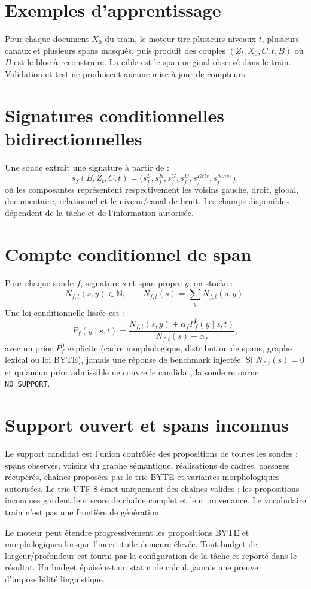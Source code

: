 \documentclass[11pt,a4paper,oneside]{report}
\newcommand{\N}{\mathbb{N}}
\begin{document}
\section{Exemples d'apprentissage}
Pour chaque document $X_0$ du train, le moteur tire plusieurs niveaux $t$, plusieurs canaux et plusieurs spans masqués, puis produit des couples $(Z_t,X_0,C,t,B)$ où $B$ est le bloc à reconstruire. La cible est le span original observé dans le train. Validation et test ne produisent aucune mise à jour de compteurs.

\section{Signatures conditionnelles bidirectionnelles}
Une sonde extrait une signature à partir de :
\[
s_f(B,Z_t,C,t)=\bigl(s_f^{L},s_f^{R},s_f^{G},s_f^{D},s_f^{Rels},s_f^{Noise}\bigr),
\]
où les composantes représentent respectivement les voisins gauche, droit, global, documentaire, relationnel et le niveau/canal de bruit. Les champs disponibles dépendent de la tâche et de l'information autorisée.

\section{Compte conditionnel de span}
Pour chaque sonde $f$, signature $s$ et span propre $y$, on stocke :
\[
N_{f,t}(s,y)\in\N,\qquad N_{f,t}(s)=\sum_yN_{f,t}(s,y).
\]
Une loi conditionnelle lissée est :
\[
P_f(y\mid s,t)=
\frac{N_{f,t}(s,y)+\alpha_f P_f^0(y\mid s,t)}
{N_{f,t}(s)+\alpha_f},
\]
avec un prior $P_f^0$ explicite (cadre morphologique, distribution de spans, graphe lexical ou loi BYTE), jamais une réponse de benchmark injectée. Si $N_{f,t}(s)=0$ et qu'aucun prior admissible ne couvre le candidat, la sonde retourne \texttt{NO\_SUPPORT}.

\section{Support ouvert et spans inconnus}
Le support candidat est l'union contrôlée des propositions de toutes les sondes : spans observés, voisins du graphe sémantique, réalisations de cadres, passages récupérés, chaînes proposées par le trie BYTE et variantes morphologiques autorisées. Le trie UTF-8 émet uniquement des chaînes valides ; les propositions inconnues gardent leur score de chaîne complet et leur provenance. Le vocabulaire train n'est pas une frontière de génération.

Le moteur peut étendre progressivement les propositions BYTE et morphologiques lorsque l'incertitude demeure élevée. Tout budget de largeur/profondeur est fourni par la configuration de la tâche et reporté dans le résultat. Un budget épuisé est un statut de calcul, jamais une preuve d'impossibilité linguistique.
\end{document}
